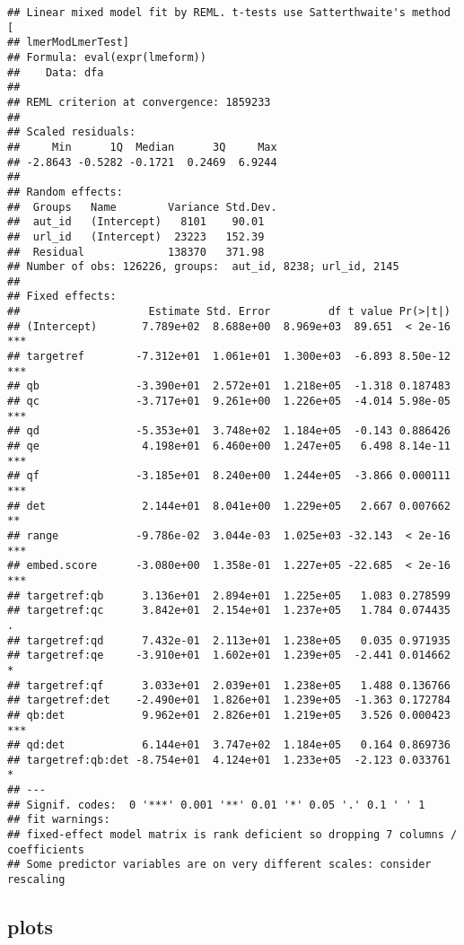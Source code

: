 \documentclass[
  12pt,
  oneside]{book}
\begin{document}
\begin{verbatim}
## Linear mixed model fit by REML. t-tests use Satterthwaite's method [
## lmerModLmerTest]
## Formula: eval(expr(lmeform))
##    Data: dfa
## 
## REML criterion at convergence: 1859233
## 
## Scaled residuals: 
##     Min      1Q  Median      3Q     Max 
## -2.8643 -0.5282 -0.1721  0.2469  6.9244 
## 
## Random effects:
##  Groups   Name        Variance Std.Dev.
##  aut_id   (Intercept)   8101    90.01  
##  url_id   (Intercept)  23223   152.39  
##  Residual             138370   371.98  
## Number of obs: 126226, groups:  aut_id, 8238; url_id, 2145
## 
## Fixed effects:
##                    Estimate Std. Error         df t value Pr(>|t|)    
## (Intercept)       7.789e+02  8.688e+00  8.969e+03  89.651  < 2e-16 ***
## targetref        -7.312e+01  1.061e+01  1.300e+03  -6.893 8.50e-12 ***
## qb               -3.390e+01  2.572e+01  1.218e+05  -1.318 0.187483    
## qc               -3.717e+01  9.261e+00  1.226e+05  -4.014 5.98e-05 ***
## qd               -5.353e+01  3.748e+02  1.184e+05  -0.143 0.886426    
## qe                4.198e+01  6.460e+00  1.247e+05   6.498 8.14e-11 ***
## qf               -3.185e+01  8.240e+00  1.244e+05  -3.866 0.000111 ***
## det               2.144e+01  8.041e+00  1.229e+05   2.667 0.007662 ** 
## range            -9.786e-02  3.044e-03  1.025e+03 -32.143  < 2e-16 ***
## embed.score      -3.080e+00  1.358e-01  1.227e+05 -22.685  < 2e-16 ***
## targetref:qb      3.136e+01  2.894e+01  1.225e+05   1.083 0.278599    
## targetref:qc      3.842e+01  2.154e+01  1.237e+05   1.784 0.074435 .  
## targetref:qd      7.432e-01  2.113e+01  1.238e+05   0.035 0.971935    
## targetref:qe     -3.910e+01  1.602e+01  1.239e+05  -2.441 0.014662 *  
## targetref:qf      3.033e+01  2.039e+01  1.238e+05   1.488 0.136766    
## targetref:det    -2.490e+01  1.826e+01  1.239e+05  -1.363 0.172784    
## qb:det            9.962e+01  2.826e+01  1.219e+05   3.526 0.000423 ***
## qd:det            6.144e+01  3.747e+02  1.184e+05   0.164 0.869736    
## targetref:qb:det -8.754e+01  4.124e+01  1.233e+05  -2.123 0.033761 *  
## ---
## Signif. codes:  0 '***' 0.001 '**' 0.01 '*' 0.05 '.' 0.1 ' ' 1
## fit warnings:
## fixed-effect model matrix is rank deficient so dropping 7 columns / coefficients
## Some predictor variables are on very different scales: consider rescaling
\end{verbatim}

\subsection{plots}\label{plots-2}
\end{document}

